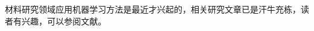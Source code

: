 材料研究领域应用机器学习方法是最近才兴起的，相关研究文章已是汗牛充栋，读者有兴趣，可以参阅文献\cite{Nature559-547_2018,NPJCM3-54_2017,COSSMS21-167_2016,JM3-519_2017,JMR31-977_2016,MRSB41-399_2016,Science361-360_2018,JCP148-241401_2018,MRSB43-683_2018}。%


